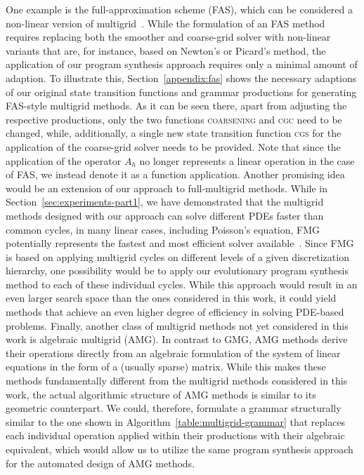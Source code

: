 One example is the full-approximation scheme (FAS), which can be considered a non-linear version of multigrid~\cite{trottenberg2000multigrid,briggs2000multigrid}.
While the formulation of an FAS method requires replacing both the smoother and coarse-grid solver with non-linear variants that are, for instance, based on Newton's or Picard's method, the application of our program synthesis approach requires only a minimal amount of adaption.
To illustrate this, Section~\ref{appendix:fas} shows the necessary adaptions of our original state transition functions and grammar productions for generating FAS-style multigrid methods. 
As it can be seen there, apart from adjusting the respective productions, only the two functions \textsc{coarsening} and \textsc{cgc} need to be changed, while, additionally, a single new state transition function \textsc{cgs} for the application of the coarse-grid solver needs to be provided. 
Note that since the application of the operator $A_h$ no longer represents a linear operation in the case of FAS, we instead denote it as a function application.
Another promising idea would be an extension of our approach to full-multigrid methods.
While in Section~\ref{sec:experiments-part1}, we have demonstrated that the multigrid methods designed with our approach can solve different PDEs faster than common cycles, in many linear cases, including Poisson's equation, FMG potentially represents the fastest and most efficient solver available~\cite{trottenberg2000multigrid}.
Since FMG is based on applying multigrid cycles on different levels of a given discretization hierarchy, one possibility would be to apply our evolutionary program synthesis method to each of these individual cycles.
While this approach would result in an even larger search space than the ones considered in this work, it could yield methods that achieve an even higher degree of efficiency in solving PDE-based problems.
Finally, another class of multigrid methods not yet considered in this work is algebraic multigrid (AMG).
In contrast to GMG, AMG methods derive their operations directly from an algebraic formulation of the system of linear equations in the form of a (usually sparse) matrix.
While this makes these methods fundamentally different from the multigrid methods considered in this work, the actual algorithmic structure of AMG methods is similar to its geometric counterpart.
We could, therefore, formulate a grammar structurally similar to the one shown in Algorithm~\ref{table:multigrid-grammar} that replaces each individual operation applied within their productions with their algebraic equivalent, which would allow us to utilize the same program synthesis approach for the automated design of AMG methods.
